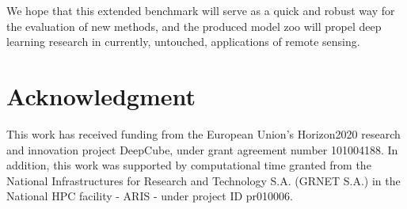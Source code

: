\documentclass[journal]{IEEEtran}
\begin{document}
We hope that this extended benchmark will serve as a quick and robust way for the evaluation of new methods, and the produced model zoo will propel deep learning research in currently, untouched, applications of remote sensing.


\section*{Acknowledgment}
 This work has received funding from the European Union’s Horizon2020 research and innovation project DeepCube, under grant agreement number 101004188. In addition, this work was supported by computational time granted from the National Infrastructures for Research and Technology S.A. (GRNET S.A.) in the National HPC facility - ARIS - under project ID pr010006.


\end{document}
